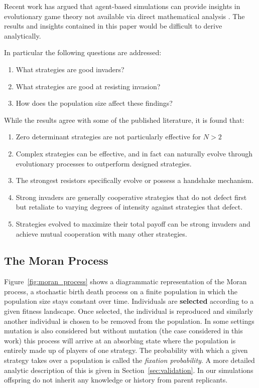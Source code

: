 \documentclass[10pt,journal]{IEEEtran}
\begin{document}
Recent work has argued that agent-based
simulations can provide insights in evolutionary game theory not available
via direct mathematical analysis \cite{adami2016evolutionary}. The results
and insights contained in this paper would be difficult to derive analytically.

In particular the following questions are addressed:
\begin{enumerate}
    \item What strategies are good invaders?
    \item What strategies are good at resisting invasion?
    \item How does the population size affect these findings?
\end{enumerate}

While the results agree with some of the published literature, it is found that:

\begin{enumerate}
 \item Zero determinant strategies are not particularly effective for $N > 2$
 \item Complex strategies can be effective, and in fact can naturally evolve
     through evolutionary processes to outperform designed strategies.
 \item The strongest resistors specifically evolve or possess a handshake mechanism.
 \item Strong invaders are generally cooperative strategies that do not defect
 first but retaliate to varying degrees of intensity against strategies that defect.
 \item Strategies evolved to maximize their total payoff can be strong invaders
 and achieve mutual cooperation with many other strategies.
\end{enumerate}

\subsection{The Moran Process}\label{sec:the_moran_process}

Figure~\ref{fig:moran_process} shows a diagrammatic representation of the Moran
process, a stochastic birth death process on a finite population in which the
population size stays constant over time. Individuals are \textbf{selected}
according to a given fitness landscape. Once selected, the individual is
reproduced and similarly another individual is chosen to be removed from the
population. In some settings mutation is also considered but without mutation
(the case considered in this work) this process will arrive at an absorbing
state where the population is entirely made up of players of one strategy. The
probability with which a given strategy takes over a population is called the
\textit{fixation probability}. A more detailed analytic description of this is
given in Section~\ref{sec:validation}. In our simulations offspring do not
inherit any knowledge or history from parent replicants.
\end{document}
